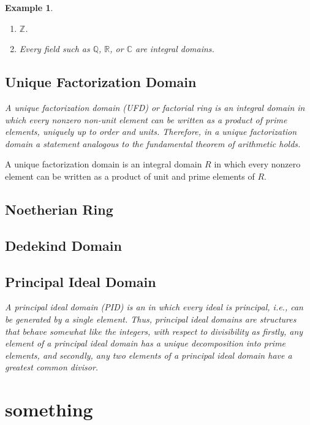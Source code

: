 \documentclass[a4paper]{book}
\theoremstyle{break}
\newtheorem{example}{Example}
\theoremstyle{plain}
\begin{document}
\begin{example}
    \begin{enumerate}
        \item \(\mathbb{Z}\).
        \item Every field such as \(\mathbb{Q}\), \(\mathbb{R}\), or \(\mathbb{C}\) are integral domains.
    \end{enumerate}
\end{example}

\section{Unique Factorization Domain}

\textit{A unique factorization domain (UFD) or factorial ring is an integral domain in which every nonzero non-unit element can be written as a product of prime elements, uniquely up to order and units. Therefore, in a unique factorization domain a statement analogous to the fundamental theorem of arithmetic holds.}

\begin{definition}
    A unique factorization domain is an integral domain \(R\) in which every nonzero element can be written as a product of unit and prime elements of \(R\).
\end{definition}

\section{Noetherian Ring}

\section{Dedekind Domain}

\section{Principal Ideal Domain}

\textit{A principal ideal domain (PID) is an in which every ideal is principal, i.e., can be generated by a single element. Thus, principal ideal domains are structures that behave somewhat like the integers, with respect to divisibility as firstly, any element of a principal ideal domain has a unique decomposition into prime elements, and secondly, any two elements of a principal ideal domain have a greatest common divisor.}


\chapter{something}
\end{document}
